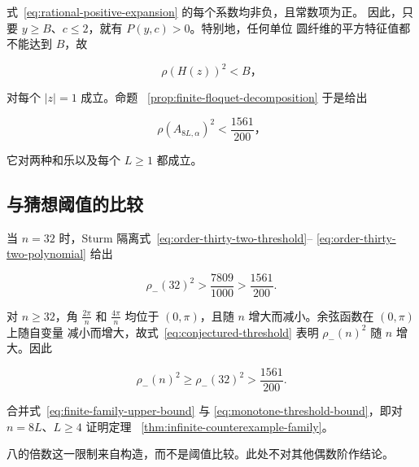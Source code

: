 式~\eqref{eq:rational-positive-expansion} 的每个系数均非负，且常数项为正。
因此，只要 \(y\geq B\)、\(c\leq2\)，就有 \(P(y,c)>0\)。特别地，任何单位
圆纤维的平方特征值都不能达到 \(B\)，故

\begin{equation}
\label{eq:uniform-fiber-bound}
\rho(H(z))^{2}<B\text{，}
\end{equation}

对每个 \(\lvert z\rvert=1\) 成立。命题~
\ref{prop:finite-floquet-decomposition} 于是给出

\begin{equation}
\label{eq:finite-family-upper-bound}
\rho(A_{8L,\alpha})^{2}<\frac{1561}{200}\text{，}
\end{equation}

它对两种和乐以及每个 \(L\geq1\) 都成立。

\subsection{与猜想阈值的比较}

当 \(n=32\) 时，Sturm 隔离式~\eqref{eq:order-thirty-two-threshold}--
\eqref{eq:order-thirty-two-polynomial} 给出

\begin{equation}
\label{eq:threshold-at-thirty-two}
\rho_-(32)^{2}>\frac{7809}{1000}>\frac{1561}{200}.
\end{equation}

对 \(n\geq32\)，角 \(\frac{2\pi}{n}\) 和 \(\frac{4\pi}{n}\) 均位于
\((0,\pi)\)，且随 \(n\) 增大而减小。余弦函数在 \((0,\pi)\) 上随自变量
减小而增大，故式~\eqref{eq:conjectured-threshold} 表明 \(\rho_-(n)^2\) 随
\(n\) 增大。因此

\begin{equation}
\label{eq:monotone-threshold-bound}
\rho_-(n)^{2}\geq \rho_-(32)^{2}>\frac{1561}{200}.
\end{equation}

合并式~\eqref{eq:finite-family-upper-bound} 与
\eqref{eq:monotone-threshold-bound}，即对 \(n=8L\)、\(L\geq4\) 证明定理~
\ref{thm:infinite-counterexample-family}。

八的倍数这一限制来自构造，而不是阈值比较。此处不对其他偶数阶作结论。
